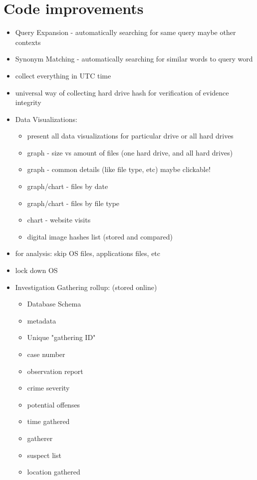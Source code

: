 \documentclass[12pt]{article}
\begin{document}
\section{Code improvements}
\begin{itemize}
  \item Query Expansion - automatically searching for same query maybe other contexts
  \item Synonym Matching - automatically searching for similar words to query word
  \item collect everything in UTC time
  \item universal way of collecting hard drive hash for verification of evidence integrity
  \item Data Visualizations:
  \begin{itemize}
    \item present all data visualizations for particular drive or all hard drives
    \item graph - size vs amount of files (one hard drive, and all hard drives)
    \item graph - common details (like file type, etc) maybe clickable!
    \item graph/chart - files by date
    \item graph/chart - files by file type
    \item chart - website visits
    \item digital image hashes list (stored and compared)
  \end{itemize}
  \item for analysis: skip OS files, applications files, etc
  \item lock down OS
  \item Investigation Gathering rollup: (stored online)
  \begin{itemize}
    \item Database Schema
    \item metadata
    \item Unique "gathering ID"
    \item case number
    \item observation report
    \item crime severity
    \item potential offenses
    \item time gathered
    \item gatherer
    \item suspect list
    \item location gathered

\end{itemize}
\end{itemize}
\end{document}
